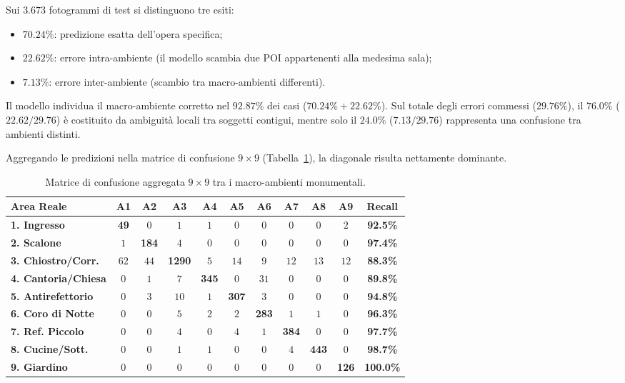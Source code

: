 Sui $3.673$ fotogrammi di test si distinguono tre esiti:
\begin{itemize}
    \item $70.24\%$: predizione esatta dell'opera specifica;
    \item $22.62\%$: errore intra-ambiente (il modello scambia due POI appartenenti alla medesima sala);
    \item $7.13\%$: errore inter-ambiente (scambio tra macro-ambienti differenti).
\end{itemize}
Il modello individua il macro-ambiente corretto nel $92.87\%$ dei casi ($70.24\% + 22.62\%$). Sul totale degli errori commessi ($29.76\%$), il $76.0\%$ ($22.62 / 29.76$) è costituito da ambiguità locali tra soggetti contigui, mentre solo il $24.0\%$ ($7.13 / 29.76$) rappresenta una confusione tra ambienti distinti.

Aggregando le predizioni nella matrice di confusione $9 \times 9$ (Tabella~\ref{tab:matrice_macro_ambienti}), la diagonale risulta nettamente dominante.

\begin{table}[htbp]
\centering
\scriptsize
\setlength{\tabcolsep}{3pt}
\begin{tabular*}{\textwidth}{@{\extracolsep{\fill}}lcccccccccc}
\toprule
\textbf{Area Reale} & \textbf{A1} & \textbf{A2} & \textbf{A3} & \textbf{A4} & \textbf{A5} & \textbf{A6} & \textbf{A7} & \textbf{A8} & \textbf{A9} & \textbf{Recall} \\
\midrule
\textbf{1. Ingresso} & \textbf{49} & $0$ & $1$ & $1$ & $0$ & $0$ & $0$ & $0$ & $2$ & \textbf{92.5\%} \\
\textbf{2. Scalone} & $1$ & \textbf{184} & $4$ & $0$ & $0$ & $0$ & $0$ & $0$ & $0$ & \textbf{97.4\%} \\
\textbf{3. Chiostro/Corr.} & $62$ & $44$ & \textbf{1290} & $5$ & $14$ & $9$ & $12$ & $13$ & $12$ & \textbf{88.3\%} \\
\textbf{4. Cantoria/Chiesa} & $0$ & $1$ & $7$ & \textbf{345} & $0$ & $31$ & $0$ & $0$ & $0$ & \textbf{89.8\%} \\
\textbf{5. Antirefettorio} & $0$ & $3$ & $10$ & $1$ & \textbf{307} & $3$ & $0$ & $0$ & $0$ & \textbf{94.8\%} \\
\textbf{6. Coro di Notte} & $0$ & $0$ & $5$ & $2$ & $2$ & \textbf{283} & $1$ & $1$ & $0$ & \textbf{96.3\%} \\
\textbf{7. Ref. Piccolo} & $0$ & $0$ & $4$ & $0$ & $4$ & $1$ & \textbf{384} & $0$ & $0$ & \textbf{97.7\%} \\
\textbf{8. Cucine/Sott.} & $0$ & $0$ & $1$ & $1$ & $0$ & $0$ & $4$ & \textbf{443} & $0$ & \textbf{98.7\%} \\
\textbf{9. Giardino} & $0$ & $0$ & $0$ & $0$ & $0$ & $0$ & $0$ & $0$ & \textbf{126} & \textbf{100.0\%} \\
\bottomrule
\end{tabular*}
\caption{Matrice di confusione aggregata $9 \times 9$ tra i macro-ambienti monumentali.}
\label{tab:matrice_macro_ambienti}
\end{table}

